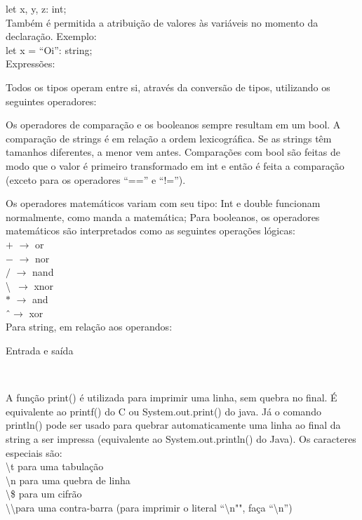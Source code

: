\documentclass[12pt,a4paper]{article}
\begin{document}
let x, y, z: int;\\

Também é permitida a atribuição de valores às variáveis no momento da declaração. Exemplo:\\

let x = ``Oi'': string;\\


Expressões:

Todos os tipos operam entre si, através da conversão de tipos, utilizando os seguintes operadores:


Os operadores de comparação e os booleanos sempre resultam em um bool. A comparação de strings é em relação a ordem lexicográfica. Se as strings têm tamanhos diferentes, a menor vem antes. Comparações com bool são feitas de modo que o valor é primeiro transformado em int e então é feita a comparação (exceto para os operadores ``=='' e ``!='').

Os operadores matemáticos variam com seu tipo:
Int e double funcionam normalmente, como manda a matemática;
Para booleanos, os operadores matemáticos são interpretados como as seguintes operações lógicas:\\[0.2cm]
$+$ $\rightarrow$ or\\
$-$ $\rightarrow$ nor\\
$/$ $\rightarrow$ nand\\
\textbackslash\ $\rightarrow$ xnor\\
$*$ $\rightarrow$ and\\
\^ \ $\rightarrow$ xor\\

Para string, em relação aos operandos:

\hypertarget{Entrada e saída}{\Large{Entrada e saída}}\\[0.3cm]
\normalsize

A função print() é utilizada para imprimir uma linha, sem quebra no final. É equivalente ao printf() do C ou System.out.print() do java. Já o comando println() pode ser usado para quebrar automaticamente uma linha ao final da string a ser impressa (equivalente ao System.out.println() do Java). Os caracteres especiais são:\\[0.2cm]
\textbackslash t para uma tabulação \\
\textbackslash n para uma quebra de linha \\
\textbackslash \$ para um cifrão \\
\textbackslash \textbackslash para uma contra-barra (para imprimir o literal ``\textbackslash n"", faça ``\textbackslash n'') \\
\end{document}
